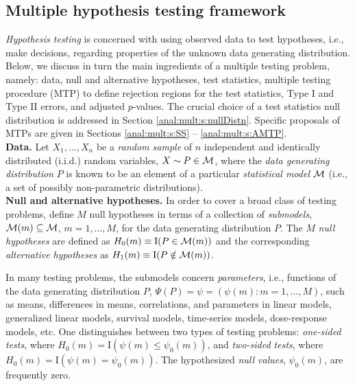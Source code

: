 \documentclass[11pt]{article}
\begin{document}
\subsection{Multiple hypothesis testing framework}
\label{anal:mult:s:framework}

{\em Hypothesis testing} is concerned with using observed data to test hypotheses, i.e.,  make decisions, regarding properties of the unknown data generating distribution. 
Below, we discuss in turn the main ingredients of a multiple testing problem, namely: data, null and alternative hypotheses, test statistics, multiple testing procedure (MTP) to define rejection regions for the test statistics, Type I and Type II errors, and adjusted $p$-values. 
The crucial choice of a test statistics null distribution is addressed in Section \ref{anal:mult:s:nullDistn}. 
Specific proposals of MTPs are given in Sections \ref{anal:mult:s:SS} -- \ref{anal:mult:s:AMTP}.\\

\noindent
{\bf Data.} Let $X_1,\ldots,X_n$ be a {\em random sample} of $n$ independent and identically distributed (i.i.d.) random variables, $X \sim P\in {\cal M}$, where the {\em data generating distribution} $P$ is known to be an element of a particular {\em statistical model} ${\cal M}$ (i.e., a set of possibly non-parametric distributions).\\

\noindent
{\bf Null and alternative hypotheses.} 
In order to cover a broad class of testing problems, define $M$
null hypotheses in terms of a collection of {\em submodels}, ${\cal
  M}(m)\subseteq {\cal M}$,  $m=1,\ldots,M$, for the data generating
distribution $P$. The $M$ {\em null hypotheses} are defined as
$H_0(m) \equiv \mathrm{I}(P\in {\cal M}(m))$ and the corresponding {\em
  alternative hypotheses} as $H_1(m) \equiv \mathrm{I}(P \notin {\cal M}(m))$.

In many testing problems, the submodels concern {\em parameters}, i.e., functions of the data generating distribution $P$, $\Psi(P) = \psi= (\psi(m):m=1,\ldots,M)$, such as means, differences in means, correlations, and parameters in linear models, generalized linear models, survival models, time-series models, dose-response models, etc. One distinguishes between two types of testing problems: {\em one-sided tests}, where $H_0(m) = \mathrm{I}(\psi(m) \leq \psi_0(m))$, and {\em two-sided tests}, where $H_0(m) = \mathrm{I}(\psi(m) =
\psi_0(m))$.
The hypothesized {\em null values}, $\psi_0(m)$, are frequently zero.
\end{document}

